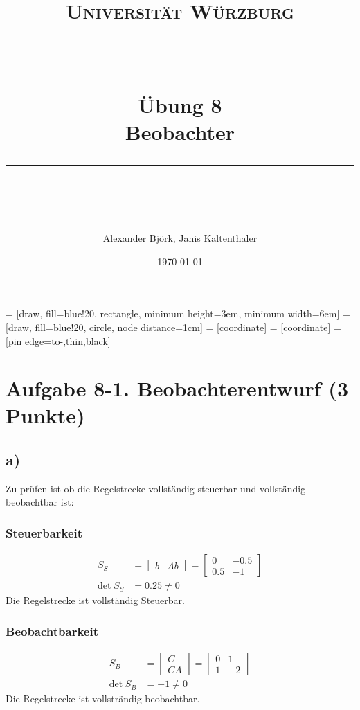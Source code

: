 \documentclass[11pt]{scrartcl} %
\title{	
	\normalfont\normalsize
	\textsc{Universität Würzburg}\\ %
	\vspace{25pt} %
	\rule{\linewidth}{0.5pt}\\ %
	\vspace{20pt} %
	{\huge Übung 8}\\ %
	{\Large Beobachter}\\
	\vspace{12pt} %
	\rule{\linewidth}{2pt}\\ %
	\vspace{12pt} %
}
\author{\LARGE Alexander Björk, Janis Kaltenthaler} %
\date{\normalsize\today} %
\begin{document}
\maketitle %

 = [draw, fill=blue!20, rectangle, 
    minimum height=3em, minimum width=6em]
 = [draw, fill=blue!20, circle, node distance=1cm]
 = [coordinate]
 = [coordinate]
 = [pin edge={to-,thin,black}]
\newcommand{\inte}{$\displaystyle \int$}

\section*{Aufgabe 8-1. Beobachterentwurf (3 Punkte)}
\subsection*{a)}
Zu prüfen ist ob die Regelstrecke vollständig steuerbar und vollständig beobachtbar ist:
\subsubsection*{Steuerbarkeit}
\begin{align*}
	S_S&=\begin{bmatrix}b&Ab \end{bmatrix}=\begin{bmatrix}0&-0.5\\0.5&-1 \end{bmatrix}\\
	\text{det}\hspace{3pt}S_S&=0.25\neq0
\end{align*}
Die Regelstrecke ist vollständig Steuerbar.
\subsubsection*{Beobachtbarkeit}
\begin{align*}
	S_B&=\begin{bmatrix}C\\CA \end{bmatrix}=\begin{bmatrix}0&1\\1&-2 \end{bmatrix}\\
	\text{det}\hspace{3pt}S_B&=-1\neq0
\end{align*}
Die Regelstrecke ist vollsträndig beobachtbar.
\end{document}
